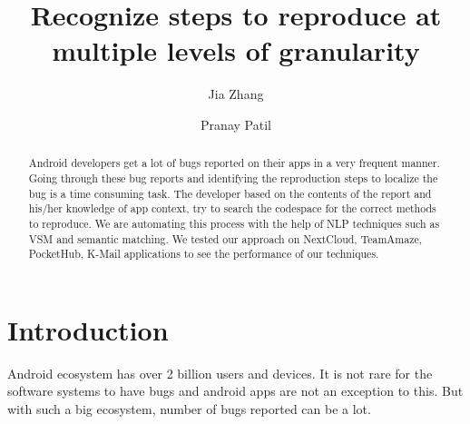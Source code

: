 \documentclass[sigconf]{acmart}
\begin{document}
\title{Recognize steps to reproduce at multiple levels of granularity}

\author{Jia Zhang}

\author{Pranay Patil}


\begin{abstract}
Android developers get a lot of bugs reported on their apps in a very frequent manner. Going through these bug reports and identifying the reproduction steps to localize the bug is a time consuming task. The developer based on the contents of the report and his/her knowledge of app context, try to search the codespace for the correct methods to reproduce. We are automating this process with the help of NLP techniques such as VSM and semantic matching. We tested our approach on NextCloud, TeamAmaze, PocketHub, K-Mail applications to see the performance of our techniques.
\end{abstract}

\maketitle
\pagestyle{empty}
\section{Introduction}
Android ecosystem has over 2 billion users and devices. It is not rare for the software systems to have bugs and android apps are not an exception to this. But with such a big ecosystem, number of bugs reported can be a lot.
\end{document}
